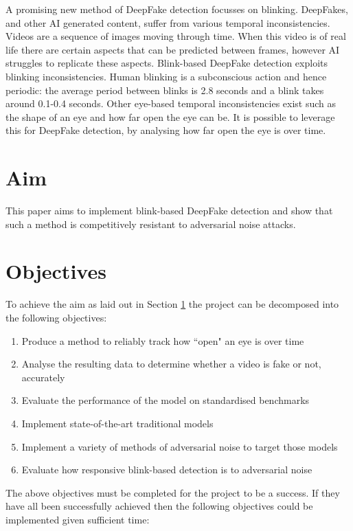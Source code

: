 A promising new method of DeepFake detection focusses on blinking. DeepFakes, and other AI generated content, suffer from various temporal inconsistencies. Videos are a sequence of images moving through time. When this video is of real life there are certain aspects that can be predicted between frames, however AI struggles to replicate these aspects. Blink-based DeepFake detection exploits blinking inconsistencies. Human blinking is a subconscious action and hence periodic: the average period between blinks is 2.8 seconds and a blink takes around 0.1-0.4 seconds\cite{schiffman1990sensation}. Other eye-based temporal inconsistencies exist such as the shape of an eye and how far open the eye can be. It is possible to leverage this for DeepFake detection, by analysing how far open the eye is over time.

\section{Aim}
\label{sec:aim}

This paper aims to implement blink-based DeepFake detection and show that such a method is competitively resistant to adversarial noise attacks.

\section{Objectives}
\label{sec:objectives}

To achieve the aim as laid out in Section \ref{sec:aim} the project can be decomposed into the following objectives:

\begin{enumerate}
    \item Produce a method to reliably track how ``open" an eye is over time
    \item Analyse the resulting data to determine whether a video is fake or not, accurately
    \item Evaluate the performance of the model on standardised benchmarks
    \item Implement state-of-the-art traditional models
    \item Implement a variety of methods of adversarial noise to target those models
    \item Evaluate how responsive blink-based detection is to adversarial noise
\end{enumerate}

The above objectives must be completed for the project to be a success. If they have all been successfully achieved then the following objectives could be implemented given sufficient time:

